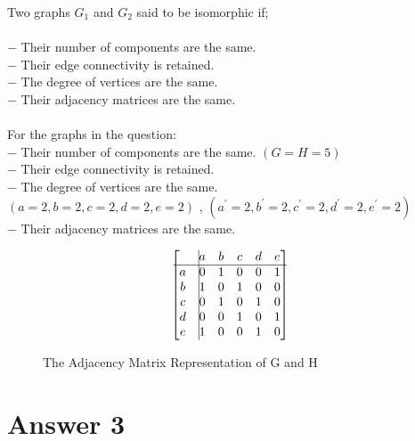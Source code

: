 \documentclass[12pt]{article}
\begin{document}
	Two graphs $G_1$ and $G_2$ said to be isomorphic if;\\
	\\
	$-$ Their number of components are the same.\\
	$-$ Their edge connectivity is retained.\\
	$-$ The degree of vertices are the same.\\
	$-$ Their adjacency matrices are the same.\\
	\\
	For the graphs in the question:\\
	$-$ Their number of components are the same. $(G = H =5)$\\
	$-$ Their edge connectivity is retained.\\
	$-$ The degree of vertices are the same. \\$(a=2, b=2, c=2, d=2, e=2)$ , $(a^{'}=2, b^{'}=2, c^{'}=2, d^{'}=2, e^{'}=2)$\\
	$-$ Their adjacency matrices are the same.\\

\begin{figure}[H]
            $$  
                \begin{bmatrix}{}
                     &\vline a & b & c & d & e \\ 
			\hline
		  a &\vline 0 & 1 & 0 & 0 & 1 \\
                  b &\vline 1 & 0 & 1 & 0 & 0 \\
                  c &\vline 0 & 1 & 0 & 1 & 0 \\
                  d &\vline 0 & 0 & 1 & 0 & 1 \\ 
		  e &\vline 1 & 0 & 0 & 1 & 0 \\
                \end{bmatrix}{} 
            $$
		\caption{The Adjacency Matrix Representation of G and H}
            \end{figure}{}




\section*{Answer 3}
\end{document}
